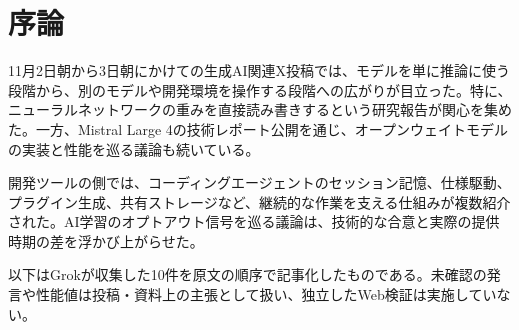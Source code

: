 \section*{序論}
11月2日朝から3日朝にかけての生成AI関連X投稿では、モデルを単に推論に使う段階から、別のモデルや開発環境を操作する段階への広がりが目立った。特に、ニューラルネットワークの重みを直接読み書きするという研究報告が関心を集めた。一方、Mistral Large 4の技術レポート公開を通じ、オープンウェイトモデルの実装と性能を巡る議論も続いている。

開発ツールの側では、コーディングエージェントのセッション記憶、仕様駆動、プラグイン生成、共有ストレージなど、継続的な作業を支える仕組みが複数紹介された。AI学習のオプトアウト信号を巡る議論は、技術的な合意と実際の提供時期の差を浮かび上がらせた。

以下はGrokが収集した10件を原文の順序で記事化したものである。未確認の発言や性能値は投稿・資料上の主張として扱い、独立したWeb検証は実施していない。

